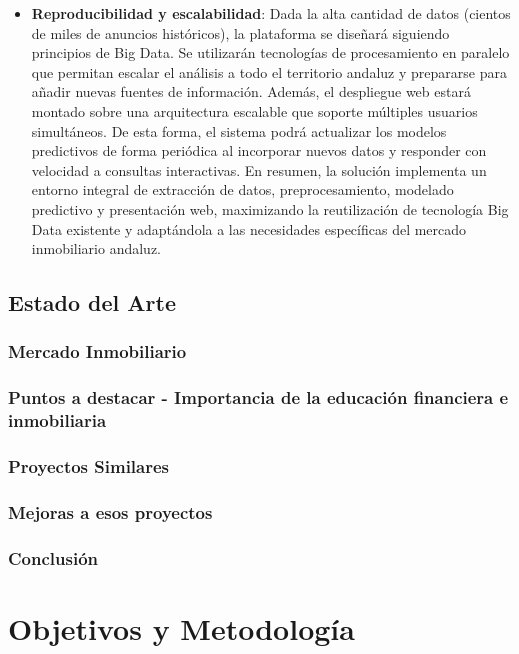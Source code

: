 \documentclass[a4paper,11pt]{book}
\begin{document}
\begin{itemize}
    \item \textbf{Reproducibilidad y escalabilidad}: Dada la alta cantidad de datos (cientos de miles de anuncios históricos), la plataforma se diseñará siguiendo principios de Big Data. Se utilizarán tecnologías de procesamiento en paralelo que permitan escalar el análisis a todo el territorio andaluz y prepararse para añadir nuevas fuentes de información. Además, el despliegue web estará montado sobre una arquitectura escalable que soporte múltiples usuarios simultáneos. De esta forma, el sistema podrá actualizar los modelos predictivos de forma periódica al incorporar nuevos datos y responder con velocidad a consultas interactivas. En resumen, la solución implementa un entorno integral de extracción de datos, preprocesamiento, modelado predictivo y presentación web, maximizando la reutilización de tecnología Big Data existente y adaptándola a las necesidades específicas del mercado inmobiliario andaluz.
\end{itemize}

\section{Estado del Arte}

\subsection{Mercado Inmobiliario}
\subsection{Puntos a destacar - Importancia de la educación financiera e inmobiliaria}
\subsection{Proyectos Similares}
\subsection{Mejoras a esos proyectos}
\subsection{Conclusión}

\chapter{Objetivos y Metodología}
 
\end{document}
